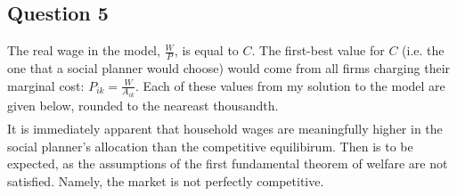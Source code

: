 \documentclass{article}
\begin{document}
\pagebreak
\subsection*{Question 5}

The real wage in the model, $\frac{W}{P}$, is equal to $C$. The first-best value for $C$ (i.e. the one that a social planner would choose) would come from all firms charging their marginal cost: ${P_{ik} = \frac{W}{A_{ik}}}$. Each of these values from my solution to the model are given below, rounded to the neareast thousandth.
\begin{align*}
	
\end{align*}
It is immediately apparent that household wages are meaningfully higher in the social planner's allocation than the competitive equilibirum. Then is to be expected, as the assumptions of the first fundamental theorem of welfare are not satisfied. Namely, the market is not perfectly competitive.



\end{document}
